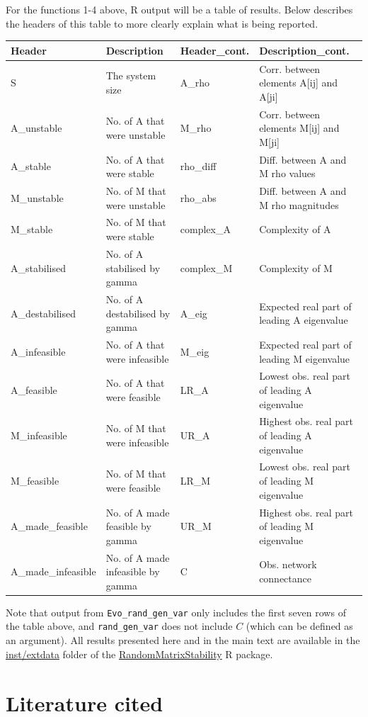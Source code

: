 \documentclass[]{article}
\begin{document}
For the functions 1-4 above, R output will be a table of results. Below
describes the headers of this table to more clearly explain what is
being reported.

\footnotesize

\begin{longtable}[]{@{}llll@{}}
\toprule
Header & Description & Header\_cont. & Description\_cont.\tabularnewline
\midrule
\endhead
S & The system size & A\_rho & Corr. between elements A{[}ij{]} and
A{[}ji{]}\tabularnewline
A\_unstable & No. of A that were unstable & M\_rho & Corr. between
elements M{[}ij{]} and M{[}ji{]}\tabularnewline
A\_stable & No. of A that were stable & rho\_diff & Diff. between A and
M rho values\tabularnewline
M\_unstable & No. of M that were unstable & rho\_abs & Diff. between A
and M rho magnitudes\tabularnewline
M\_stable & No. of M that were stable & complex\_A & Complexity of
A\tabularnewline
A\_stabilised & No. of A stabilised by gamma & complex\_M & Complexity
of M\tabularnewline
A\_destabilised & No. of A destabilised by gamma & A\_eig & Expected
real part of leading A eigenvalue\tabularnewline
A\_infeasible & No. of A that were infeasible & M\_eig & Expected real
part of leading M eigenvalue\tabularnewline
A\_feasible & No. of A that were feasible & LR\_A & Lowest obs. real
part of leading A eigenvalue\tabularnewline
M\_infeasible & No. of M that were infeasible & UR\_A & Highest obs.
real part of leading A eigenvalue\tabularnewline
M\_feasible & No. of M that were feasible & LR\_M & Lowest obs. real
part of leading M eigenvalue\tabularnewline
A\_made\_feasible & No. of A made feasible by gamma & UR\_M & Highest
obs. real part of leading M eigenvalue\tabularnewline
A\_made\_infeasible & No. of A made infeasible by gamma & C & Obs.
network connectance\tabularnewline
\bottomrule
\end{longtable}

\normalsize

Note that output from \texttt{Evo\_rand\_gen\_var} only includes the
first seven rows of the table above, and \texttt{rand\_gen\_var} does
not include \(C\) (which can be defined as an argument). All results
presented here and in the main text are available in the
\href{https://github.com/bradduthie/RandomMatrixStability/tree/master/inst/extdata}{inst/extdata}
folder of the
\href{https://github.com/bradduthie/RandomMatrixStability}{RandomMatrixStability}
R package.

\hypertarget{ref}{\section*{Literature cited}\label{ref}}
\end{document}
